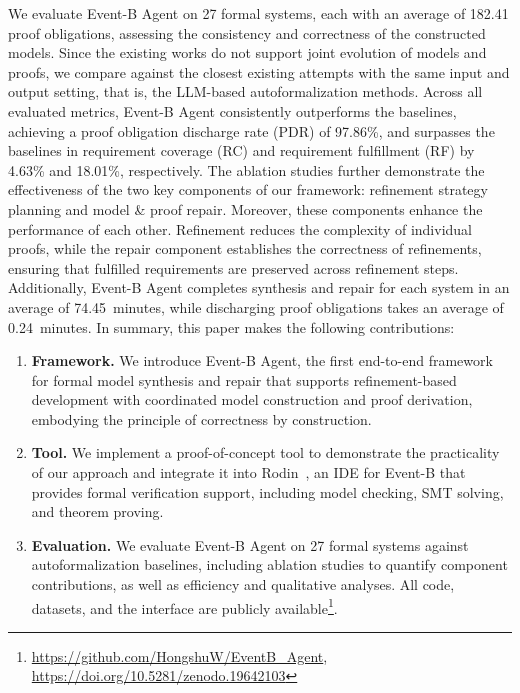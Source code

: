 We evaluate Event-B Agent on 27 formal systems, each with an average of 182.41 proof obligations, assessing the consistency and correctness of the constructed models.
Since the existing works do not support joint evolution of models and proofs, we compare against the closest existing attempts with the same input and output setting, that is, the LLM-based autoformalization methods.
Across all evaluated metrics, Event-B Agent consistently outperforms the baselines, achieving a proof obligation discharge rate (PDR) of 97.86\%, and surpasses the baselines in requirement coverage (RC) and requirement fulfillment (RF) by 4.63\% and 18.01\%, respectively.
The ablation studies further demonstrate the effectiveness of the two key components of our framework: refinement strategy planning and model \& proof repair.
Moreover, these components enhance the performance of each other.
Refinement reduces the complexity of individual proofs, while the repair component establishes the correctness of refinements, ensuring that fulfilled requirements are preserved across refinement steps.
Additionally, Event-B Agent completes synthesis and repair for each system in an average of \SI{74.45}{minutes}, while discharging proof obligations takes an average of \SI{0.24}{minutes}.
In summary, this paper makes the following contributions:
\begin{enumerate}
  \item \textbf{Framework.} We introduce Event-B Agent, the first end-to-end framework for formal model synthesis and repair that supports refinement-based development with coordinated model construction and proof derivation, embodying the principle of correctness by construction.
  \item \textbf{Tool.} We implement a proof-of-concept tool to demonstrate the practicality of our approach and integrate it into Rodin~\cite{rodin}, an IDE for Event-B that provides formal verification support, including model checking, SMT solving, and theorem proving.
  \item \textbf{Evaluation.} We evaluate Event-B Agent on 27 formal systems against autoformalization baselines, including ablation studies to quantify component contributions, as well as efficiency and qualitative analyses. All code, datasets, and the interface are publicly available\footnote{\url{https://github.com/HongshuW/EventB_Agent}, \url{https://doi.org/10.5281/zenodo.19642103}}.
\end{enumerate}

